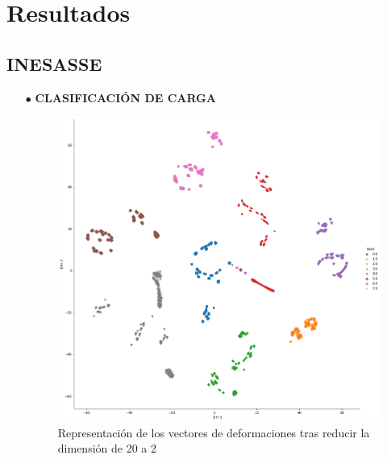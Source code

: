 \section{Resultados}

\subsection{INESASSE}

\begin{itemize}
    \item[$\bullet$] \textbf{CLASIFICACIÓN DE CARGA}
    
    \begin{figure}[h!]
        \centering
        \includegraphics[width=150mm]{3/Fotos/Load_INESASSE_t-sne.png}
        \captionsetup{justification=centering,margin=1.25cm}
        \caption{Representación de los vectores de deformaciones tras reducir la dimensión de 20 a 2}
        \label{def_h}
    \end{figure}  
    

\end{itemize}
